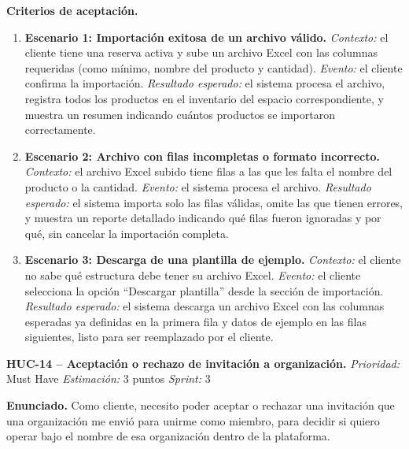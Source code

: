 \textbf{Criterios de aceptación.}
\begin{enumerate}
\item \textbf{Escenario 1: Importación exitosa de un archivo válido.} \textit{Contexto:} el cliente tiene una reserva activa y sube un archivo Excel con las columnas requeridas (como mínimo, nombre del producto y cantidad). \textit{Evento:} el cliente confirma la importación. \textit{Resultado esperado:} el sistema procesa el archivo, registra todos los productos en el inventario del espacio correspondiente, y muestra un resumen indicando cuántos productos se importaron correctamente.
\item \textbf{Escenario 2: Archivo con filas incompletas o formato incorrecto.} \textit{Contexto:} el archivo Excel subido tiene filas a las que les falta el nombre del producto o la cantidad. \textit{Evento:} el sistema procesa el archivo. \textit{Resultado esperado:} el sistema importa solo las filas válidas, omite las que tienen errores, y muestra un reporte detallado indicando qué filas fueron ignoradas y por qué, sin cancelar la importación completa.
\item \textbf{Escenario 3: Descarga de una plantilla de ejemplo.} \textit{Contexto:} el cliente no sabe qué estructura debe tener su archivo Excel. \textit{Evento:} el cliente selecciona la opción ``Descargar plantilla'' desde la sección de importación. \textit{Resultado esperado:} el sistema descarga un archivo Excel con las columnas esperadas ya definidas en la primera fila y datos de ejemplo en las filas siguientes, listo para ser reemplazado por el cliente.
\end{enumerate}

\textbf{HUC-14 -- Aceptación o rechazo de invitación a organización.} \label{req:HUC-14}
\textit{Prioridad:} Must Have \quad \textit{Estimación:} 3 puntos \quad \textit{Sprint:} 3

\textbf{Enunciado.} Como cliente, necesito poder aceptar o rechazar una invitación que una organización me envió para unirme como miembro, para decidir si quiero operar bajo el nombre de esa organización dentro de la plataforma.

